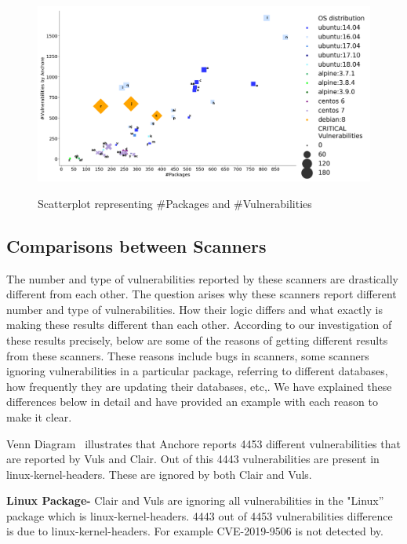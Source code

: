 \documentclass[a4paper,num-refs]{oup-contemporary}
\begin{document}
\begin{figure}[!htb]
        {\includegraphics[scale=2,width=\columnwidth]
        {Figures/vulngraph.png}}
        \caption{\label{fig:graph1} Scatterplot representing \#Packages and \#Vulnerabilities}
      \end{figure}

\subsection{Comparisons between Scanners}

The number and type of vulnerabilities reported by these scanners are drastically different from each other.
The question arises why these scanners report different number and type of vulnerabilities.
How their logic differs and what exactly is making these results different than each other.
According to our investigation of these results precisely, below are some of the reasons of
getting different results from these scanners. These reasons include bugs in scanners,
some scanners ignoring vulnerabilities in a particular package, referring to different databases,
how frequently they are updating their databases, etc,. We have explained these differences below in detail
and have provided an example with each reason to make it clear.

Venn Diagram~\cite{fig:venn} illustrates that Anchore reports 4453 different vulnerabilities that are reported
by Vuls and Clair. Out of this 4443 vulnerabilities are present in linux-kernel-headers. These are ignored by
both Clair and Vuls.

\textbf{Linux Package-} Clair and Vuls are ignoring all vulnerabilities in the "Linux” package
which is linux-kernel-headers. 4443 out of 4453 vulnerabilities difference is due to linux-kernel-headers.
For example CVE-2019-9506 is not detected by.
\end{document}
